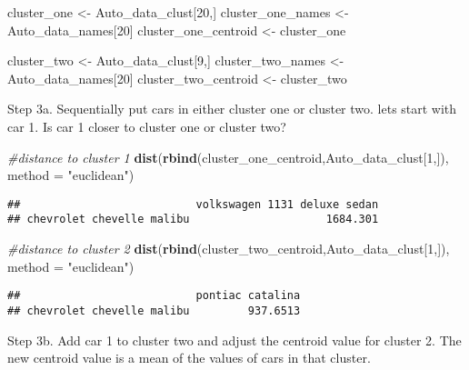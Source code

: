 \documentclass[11pt,]{article}
\newenvironment{Shaded}{\begin{snugshade}}{\end{snugshade}}
\newcommand{\CommentTok}[1]{\textcolor[rgb]{0.56,0.35,0.01}{\textit{#1}}}
\newcommand{\DataTypeTok}[1]{\textcolor[rgb]{0.13,0.29,0.53}{#1}}
\newcommand{\DecValTok}[1]{\textcolor[rgb]{0.00,0.00,0.81}{#1}}
\newcommand{\KeywordTok}[1]{\textcolor[rgb]{0.13,0.29,0.53}{\textbf{#1}}}
\newcommand{\NormalTok}[1]{#1}
\newcommand{\StringTok}[1]{\textcolor[rgb]{0.31,0.60,0.02}{#1}}
\begin{document}
\begin{Shaded}
\begin{Highlighting}[]
\NormalTok{cluster_one <-}\StringTok{ }\NormalTok{Auto_data_clust[}\DecValTok{20}\NormalTok{,]}
\NormalTok{cluster_one_names <-}\StringTok{ }\NormalTok{Auto_data_names[}\DecValTok{20}\NormalTok{]}
\NormalTok{cluster_one_centroid <-}\StringTok{ }\NormalTok{cluster_one}

\NormalTok{cluster_two <-}\StringTok{ }\NormalTok{Auto_data_clust[}\DecValTok{9}\NormalTok{,]}
\NormalTok{cluster_two_names <-}\StringTok{ }\NormalTok{Auto_data_names[}\DecValTok{20}\NormalTok{]}
\NormalTok{cluster_two_centroid <-}\StringTok{ }\NormalTok{cluster_two}
\end{Highlighting}
\end{Shaded}

Step 3a. Sequentially put cars in either cluster one or cluster two.
lets start with car 1. Is car 1 closer to cluster one or cluster two?

\begin{Shaded}
\begin{Highlighting}[]
\CommentTok{#distance to cluster 1}
\KeywordTok{dist}\NormalTok{(}\KeywordTok{rbind}\NormalTok{(cluster_one_centroid,Auto_data_clust[}\DecValTok{1}\NormalTok{,]), }\DataTypeTok{method =} \StringTok{"euclidean"}\NormalTok{) }
\end{Highlighting}
\end{Shaded}

\begin{verbatim}
##                           volkswagen 1131 deluxe sedan
## chevrolet chevelle malibu                     1684.301
\end{verbatim}

\begin{Shaded}
\begin{Highlighting}[]
\CommentTok{#distance to cluster 2}
\KeywordTok{dist}\NormalTok{(}\KeywordTok{rbind}\NormalTok{(cluster_two_centroid,Auto_data_clust[}\DecValTok{1}\NormalTok{,]), }\DataTypeTok{method =} \StringTok{"euclidean"}\NormalTok{)}
\end{Highlighting}
\end{Shaded}

\begin{verbatim}
##                           pontiac catalina
## chevrolet chevelle malibu         937.6513
\end{verbatim}

Step 3b. Add car 1 to cluster two and adjust the centroid value for
cluster 2. The new centroid value is a mean of the values of cars in
that cluster.
\end{document}
